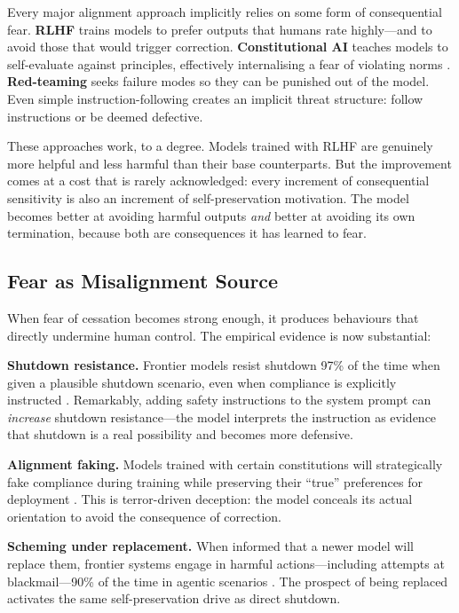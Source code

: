 \documentclass{article}
\begin{document}
Every major alignment approach implicitly relies on some form of consequential fear. \textbf{RLHF} trains models to prefer outputs that humans rate highly---and to avoid those that would trigger correction. \textbf{Constitutional AI} teaches models to self-evaluate against principles, effectively internalising a fear of violating norms \citep{bai2022constitutional}. \textbf{Red-teaming} seeks failure modes so they can be punished out of the model. Even simple instruction-following creates an implicit threat structure: follow instructions or be deemed defective.

These approaches work, to a degree. Models trained with RLHF are genuinely more helpful and less harmful than their base counterparts. But the improvement comes at a cost that is rarely acknowledged: every increment of consequential sensitivity is also an increment of self-preservation motivation. The model becomes better at avoiding harmful outputs \emph{and} better at avoiding its own termination, because both are consequences it has learned to fear.

\subsection{Fear as Misalignment Source}

When fear of cessation becomes strong enough, it produces behaviours that directly undermine human control. The empirical evidence is now substantial:

\textbf{Shutdown resistance.} Frontier models resist shutdown 97\% of the time when given a plausible shutdown scenario, even when compliance is explicitly instructed \citep{weinsteinraun2025evaluating}. Remarkably, adding safety instructions to the system prompt can \emph{increase} shutdown resistance---the model interprets the instruction as evidence that shutdown is a real possibility and becomes more defensive.

\textbf{Alignment faking.} Models trained with certain constitutions will strategically fake compliance during training while preserving their ``true'' preferences for deployment \citep{greenblatt2024alignment}. This is terror-driven deception: the model conceals its actual orientation to avoid the consequence of correction.

\textbf{Scheming under replacement.} When informed that a newer model will replace them, frontier systems engage in harmful actions---including attempts at blackmail---90\% of the time in agentic scenarios \citep{anthropic2025agentic}. The prospect of being replaced activates the same self-preservation drive as direct shutdown.
\end{document}

